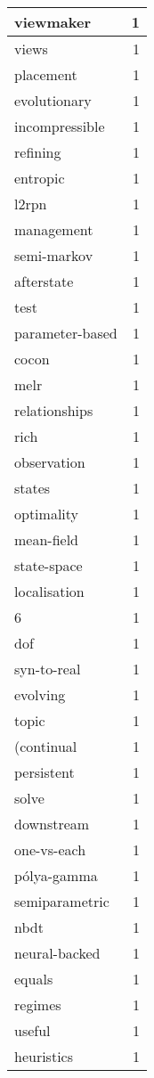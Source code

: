 \begin{table}[h]
\begin{tabular}{|l|r|}
viewmaker & 1 \\
\hline
views & 1 \\
\hline
placement & 1 \\
\hline
evolutionary & 1 \\
\hline
incompressible & 1 \\
\hline
refining & 1 \\
\hline
entropic & 1 \\
\hline
l2rpn & 1 \\
\hline
management & 1 \\
\hline
semi-markov & 1 \\
\hline
afterstate & 1 \\
\hline
test & 1 \\
\hline
parameter-based & 1 \\
\hline
cocon & 1 \\
\hline
melr & 1 \\
\hline
relationships & 1 \\
\hline
rich & 1 \\
\hline
observation & 1 \\
\hline
states & 1 \\
\hline
optimality & 1 \\
\hline
mean-field & 1 \\
\hline
state-space & 1 \\
\hline
localisation & 1 \\
\hline
6 & 1 \\
\hline
dof & 1 \\
\hline
syn-to-real & 1 \\
\hline
evolving & 1 \\
\hline
topic & 1 \\
\hline
(continual & 1 \\
\hline
persistent & 1 \\
\hline
solve & 1 \\
\hline
downstream & 1 \\
\hline
one-vs-each & 1 \\
\hline
pólya-gamma & 1 \\
\hline
semiparametric & 1 \\
\hline
nbdt & 1 \\
\hline
neural-backed & 1 \\
\hline
equals & 1 \\
\hline
regimes & 1 \\
\hline
useful & 1 \\
\hline
heuristics & 1 \\
\hline

\end{tabular}
\end{table}
